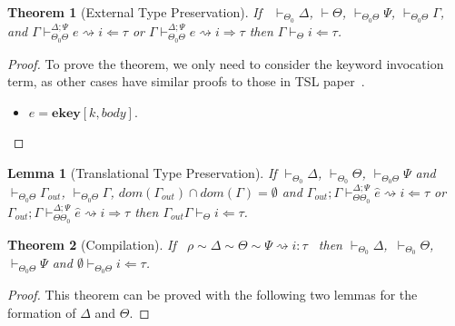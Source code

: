 \documentclass[letterpaper, notitlepage]{article}
\newcommand{\myvdash}{\vdash_{\Theta}^{\Delta}}
\newcommand{\todo}[1]{{\bf \{TODO: {#1}\}}}
\newtheorem{theorem}{Theorem}
\newtheorem{lemma}{Lemma}
\begin{document}
\begin{theorem}[External Type Preservation]
If ~$\vdash_{\Theta_0}\Delta$, $\vdash\Theta$, $\vdash_{\Theta_0\Theta}\Psi$, $\vdash_{\Theta_0\Theta}\Gamma$, and $\Gamma\vdash_{\Theta_0\Theta}^{\Delta;\Psi} e\rightsquigarrow i\Leftarrow\tau$ or $\Gamma\vdash_{\Theta_0\Theta}^{\Delta;\Psi} e\rightsquigarrow i\Rightarrow\tau$ then $\Gamma\vdash_{\Theta} i\Leftarrow\tau$.
\end{theorem}
\begin{proof}

To prove the theorem, we only need to consider the keyword invocation term, as other cases have similar proofs to those in TSL paper~\cite{TSLs}.
\begin{itemize}
\item $e=\mathbf{ekey}[k,body]$. 
\end{itemize} 
\end{proof}

\begin{lemma}[Translational Type Preservation]
If $\vdash_{\Theta_0}\Delta$, $\vdash_{\Theta_0}\Theta$, $\vdash_{\Theta_0\Theta}\Psi$ and $\vdash_{\Theta_0\Theta}\Gamma_{out}$, $\vdash_{\Theta_0\Theta}\Gamma$, $dom(\Gamma_{out})\cap dom(\Gamma)=\emptyset$ and $\Gamma_{out};\Gamma\vdash_{\Theta\Theta_0}^{\Delta;\Psi}\hat{e}\rightsquigarrow i\Leftarrow\tau$ or $\Gamma_{out};\Gamma\vdash_{\Theta\Theta_0}^{\Delta;\Psi}\hat{e}\rightsquigarrow i\Rightarrow \tau$ then $\Gamma_{out}\Gamma\vdash_{\Theta}i\Leftarrow \tau$.
\end{lemma}

\begin{theorem}[Compilation]
If ~$\rho\sim\Delta\sim\Theta\sim\Psi\rightsquigarrow i:\tau$~ then $\vdash_{\Theta_0}\Delta$,\ $\vdash_{\Theta_0}\Theta$, $\vdash_{\Theta_0\Theta}\Psi$ and $\emptyset\vdash_{\Theta_0\Theta} i\Leftarrow\tau$.
\end{theorem}
\begin{proof}
This theorem can be proved with the following two lemmas for the formation of $\Delta$ and $\Theta$.
\end{proof}
\end{document}

